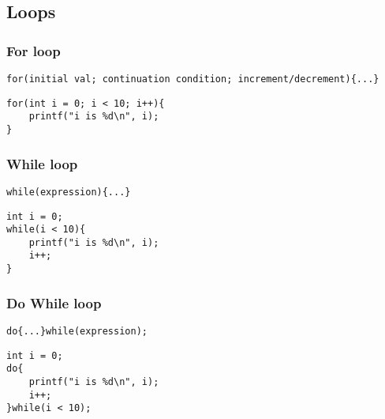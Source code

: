 \documentclass[a4paper, 10pt]{article}
\begin{document}
\subsection{Loops}
\subsubsection{For loop}
\texttt{for(initial val; continuation condition; increment/decrement)\{...\}}

\begin{lstlisting}[style=cStyle, caption={Print numbers from 0 to 9}]
for(int i = 0; i < 10; i++){
    printf("i is %d\n", i);
}
\end{lstlisting}
\subsubsection{While loop}
\texttt{while(expression)\{...\}}
\begin{lstlisting}[style=cStyle, caption={Print numbers from 0 to 9}]
int i = 0;
while(i < 10){
    printf("i is %d\n", i);
    i++;
}
\end{lstlisting}
\subsubsection{Do While loop}
\texttt{do\{...\}while(expression);}
\begin{lstlisting}[style=cStyle, caption={Print numbers from 0 to 9}]
int i = 0;
do{
    printf("i is %d\n", i);
    i++;
}while(i < 10);
\end{lstlisting}
\end{document}
